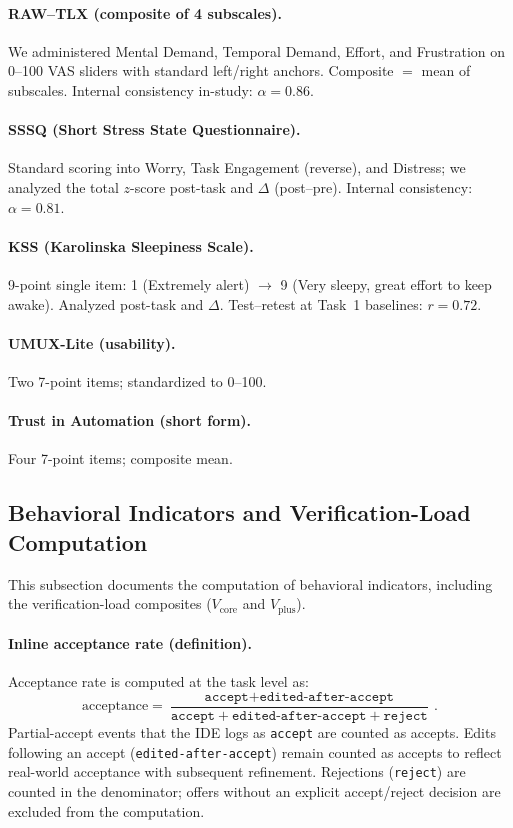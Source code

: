 \documentclass[sigconf]{acmart}
\begin{document}
\paragraph{RAW--TLX (composite of 4 subscales).}
We administered Mental Demand, Temporal Demand, Effort, and Frustration on 0--100 VAS sliders with standard left/right anchors. Composite \(=\) mean of subscales. Internal consistency in-study: \(\alpha{=}0.86\).

\paragraph{SSSQ (Short Stress State Questionnaire).}
Standard scoring into Worry, Task Engagement (reverse), and Distress; we analyzed the total \(z\)-score post-task and \(\Delta\) (post--pre). Internal consistency: \(\alpha{=}0.81\).

\paragraph{KSS (Karolinska Sleepiness Scale).}
9-point single item: 1 (Extremely alert) \(\rightarrow\) 9 (Very sleepy, great effort to keep awake). Analyzed post-task and \(\Delta\). Test–retest at Task~1 baselines: \(r{=}0.72\).

\paragraph{UMUX-Lite (usability).}
Two 7-point items; standardized to 0–100. 

\paragraph{Trust in Automation (short form).}
Four 7-point items; composite mean. 

\subsection{Behavioral Indicators and Verification-Load Computation}
\label{app:logs-vload}
This subsection documents the computation of behavioral indicators, including the verification-load composites ($V_{\text{core}}$ and $V_{\text{plus}}$).

\paragraph{Inline acceptance rate (definition).}
Acceptance rate is computed at the task level as:
\[
\text{acceptance} = \frac{\texttt{accept} + \texttt{edited-after-accept}}{\texttt{accept} + \texttt{edited-after-accept} + \texttt{reject}} \, .
\]
Partial-accept events that the IDE logs as \texttt{accept} are counted as accepts. Edits following an accept (\texttt{edited-after-accept}) remain counted as accepts to reflect real-world acceptance with subsequent refinement. Rejections (\texttt{reject}) are counted in the denominator; offers without an explicit accept/reject decision are excluded from the computation.
\end{document}
